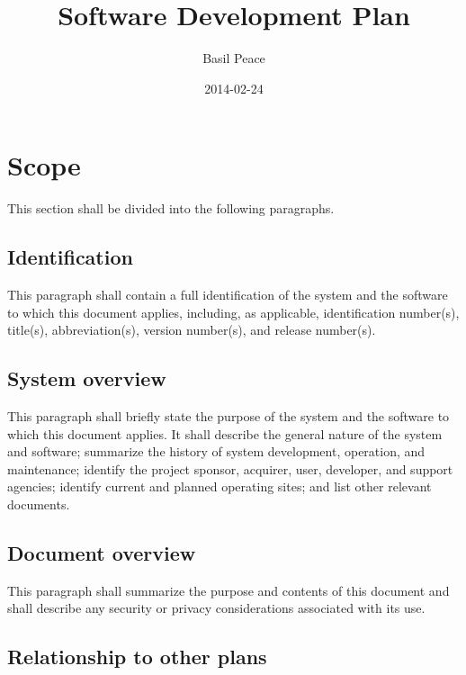 \documentclass{fidata-report-template}
\begin{document}
\frontmatter

\title{Software Development Plan}

\date{2014-02-24}

\author{Basil Peace}

\maketitle
\tableofcontents

\section{Scope}

This section shall be divided into the following paragraphs.

\subsection{Identification}

This paragraph shall contain a full identification of the system and the
software to which this document applies, including, as applicable,
identification number(s), title(s), abbreviation(s), version number(s),
and release number(s).

\subsection{System overview}

This paragraph shall briefly state the purpose of the system and the
software to which this document applies. It shall describe the general
nature of the system and software; summarize the history of system
development, operation, and maintenance; identify the project sponsor,
acquirer, user, developer, and support agencies; identify current and
planned operating sites; and list other relevant documents.

\subsection{Document overview}

This paragraph shall summarize the purpose and contents of this document
and shall describe any security or privacy considerations associated
with its use.

\subsection{Relationship to other plans}
\end{document}
